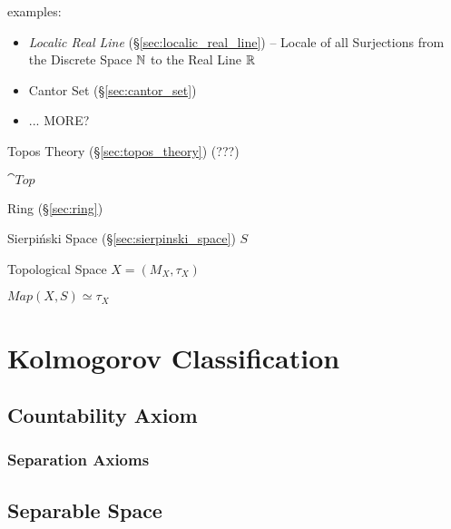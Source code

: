 examples:
\begin{itemize}
  \item \emph{Localic Real Line} (\S\ref{sec:localic_real_line}) -- Locale of
    all Surjections from the Discrete Space $\mathbb{N}$ to the Real Line $\mathbb{R}$
  \item Cantor Set (\S\ref{sec:cantor_set})
  \item ... MORE?
\end{itemize}

Topos Theory (\S\ref{sec:topos_theory}) (???)

$\cat{Top}$

Ring (\S\ref{sec:ring})

Sierpi\'nski Space (\S\ref{sec:sierpinski_space}) $S$

Topological Space $X = (M_X,\tau_X)$

$Map(X,S) \simeq \tau_X$



\section{Kolmogorov Classification}\label{sec:kolmogorov_classification}

\subsection{Countability Axiom}\label{sec:countability_axiom}

\subsubsection{Separation Axioms}\label{sec:separation_axioms}



\subsection{Separable Space}\label{sec:separable_space}


